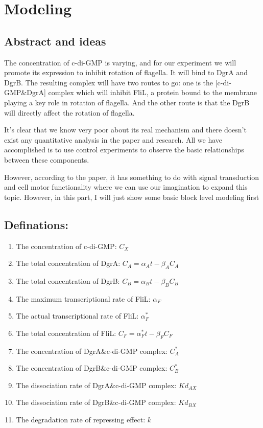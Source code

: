 \documentclass[UTF8]{ctexart}
\begin{document}
    \section{Modeling}
    \subsection{Abstract and ideas}
            The concentration of c-di-GMP is varying, and for our experiment we will promote its expression to inhibit rotation of flagella. It will bind to DgrA and DgrB. The resulting complex will have two routes to go: one is the [c-di-GMP\&DgrA] complex which will inhibit FliL, a protein bound to the membrane playing a key role in rotation of flagella. And the other route is that the DgrB will directly affect the rotation of flagella.

            It's clear that we know very poor about its real mechanism and there doesn't exist any quantitative analysis in the paper and research. All we have accomplished is to use control experiments to observe the basic relationships between these components.

            However, according to the paper, it has something to do with signal transduction and cell motor functionality where we can use our imagination to expand this topic. However, in this part, I will just show some basic block level modeling first
    \subsection{Definations:}
        \begin{enumerate}
        \item The concentration of c-di-GMP: $C_{X}$
        \item The total concentration of DgrA: $C_{A} = \alpha_{A}t - \beta_{A}C_{A}$
        \item The total concentration of DgrB: $C_{B} = \alpha_{B}t - \beta_{B}C_{B}$
        \item The maximum transcriptional rate of FliL: $\alpha_{F}$
        \item The actual transcriptional rate of FliL: $\alpha_{F}^{*}$
        \item The total concentration of FliL: $C_{F} = \alpha_{F}^{*}t - \beta_{F}C_{F}$
        \item The concentration of DgrA\&c-di-GMP complex: $C_{A}^{*}$
        \item The concentration of DgrB\&c-di-GMP complex: $C_{B}^{*}$
        \item The dissociation rate of DgrA\&c-di-GMP complex: $Kd_{AX}$
        \item The dissociation rate of DgrB\&c-di-GMP complex: $Kd_{BX}$
        \item The degradation rate of repressing effect: $k$
        \end{enumerate}
\end{document}

